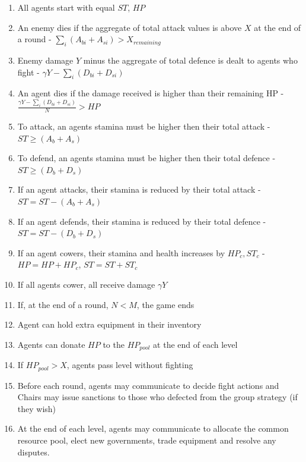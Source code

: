 \begin{enumerate}
    \item All agents start with equal $ST$, $HP$
    \item An enemy dies if the aggregate of total attack values is above $X$ at the end of a round - $\sum_{i} (A_{bi} + A_{si}) > X_{remaining}$
    \item Enemy damage $Y$ minus the aggregate of total defence is dealt to agents who fight - $\gamma Y - \sum_{i} (D_{bi} + D_{si})$
    \item An agent dies if the damage received is higher than their remaining HP -  $\frac{\gamma Y - \sum_{i} (D_{bi} + D_{si})}{N} > HP$
    \item To attack, an agents stamina must be higher then their total attack - $ST \geq (A_b + A_s)$
    \item To defend, an agents stamina must be higher then their total defence - $ST \geq (D_b + D_s)$
    \item If an agent attacks, their stamina is reduced by their total attack -  $ST = ST - (A_b + A_s)$
    \item If an agent defends, their stamina is reduced by their total defence - $ST = ST - (D_b + D_s)$
    \item If an agent cowers, their stamina and health increases by $HP_c, ST_c$ - $HP = HP + HP_c$, $ST = ST + ST_c$
    \item If all agents cower, all receive damage $\gamma Y$
    \item If, at the end of a round, $N<M$, the game ends 

    \item Agent can hold extra equipment in their inventory
    \item Agents can donate $HP$ to the $HP_{pool}$ at the end of each level
    \item If $HP_{pool} > X$, agents pass level without fighting

    \item Before each round, agents may communicate to decide fight actions and Chairs may issue sanctions to those who defected from the group strategy (if they wish)
    \item At the end of each level, agents may communicate to allocate the common resource pool, elect new governments, trade equipment and resolve any disputes.


\end{enumerate}


